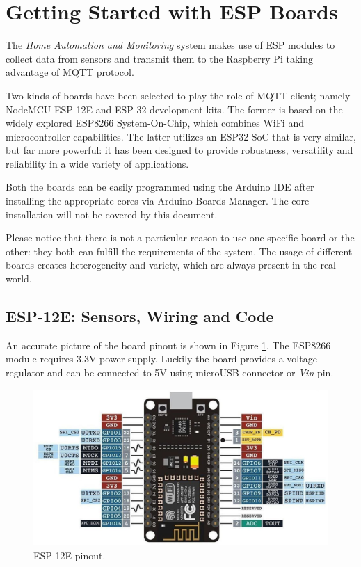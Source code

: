 \section{Getting Started with ESP Boards}
The \textit{Home Automation and Monitoring} system makes use of ESP modules to collect data from sensors and transmit them to the Raspberry Pi taking advantage of MQTT protocol.

Two kinds of boards have been selected to play the role of MQTT client; namely NodeMCU ESP-12E and ESP-32 development kits. The former is based on the widely explored ESP8266 System-On-Chip, which combines WiFi and microcontroller capabilities. The latter utilizes an ESP32 SoC that is very similar, but far more powerful: it has been designed to provide robustness, versatility and reliability in a wide variety of applications.

Both the boards can be easily programmed using the Arduino IDE after installing the appropriate cores via Arduino Boards Manager. The core installation will not be covered by this document.

Please notice that there is not a particular reason to use one specific board or the other: they both can fulfill the requirements of the system. The usage of different boards creates heterogeneity and variety, which are always present in the real world. 

\subsection{ESP-12E: Sensors, Wiring and Code}
\label{esp12_getting_started}
An accurate picture of the board pinout is shown in Figure \ref{esp12_pinout}. The ESP8266 module requires 3.3V power supply. Luckily the board provides a voltage regulator and can be connected to 5V using microUSB connector or \textit{Vin} pin.

\begin{figure}[H]
	\begin{center}
		\includegraphics[width=\textwidth]{./pictures/ESP-12E_pinout.JPG}
		\caption{ESP-12E pinout.}
		\label{esp12_pinout}
	\end{center}
\end{figure}

